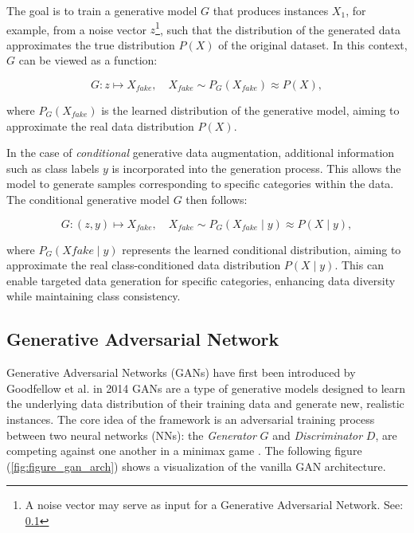 The goal is to train a generative model \( G \) that produces instances \( X_1 \), for example, from a noise vector \( z \)\footnote{A noise vector may serve as input for a Generative Adversarial Network. See: \ref{theoretical_gan}}, such that the distribution of the generated data approximates the true distribution \( P(X) \) of the original dataset. In this context, \( G \) can be viewed as a function:

\[
G: z \mapsto X_{fake}, \quad X_{fake} \sim P_G(X_{fake}) \approx P(X),
\]

\noindent
where \( P_G(X_{fake}) \) is the learned distribution of the generative model, aiming to approximate the real data distribution \( P(X) \).

In the case of \textit{conditional} generative data augmentation, additional information such as class labels \( y \) is incorporated into the generation process. This allows the model to generate samples corresponding to specific categories within the data. The conditional generative model \( G \) then follows:

\[
G: (z, y) \mapsto X_{fake}, \quad X_{fake} \sim P_G(X_{fake} \mid y) \approx P(X \mid y),
\]

\noindent
where \( P_G(X{fake} \mid y) \) represents the learned conditional distribution, aiming to approximate the real class-conditioned data distribution \( P(X \mid y) \). This can enable targeted data generation for specific categories, enhancing data diversity while maintaining class consistency.





\subsection[Generative Adversarial Network - GAN]{Generative Adversarial Network}\label{theoretical_gan}
Generative Adversarial Networks (GANs) have first been introduced by Goodfellow et al. in 2014 \cite{goodfellow2014generativeadversarialnetworks} GANs are a type of generative models designed to learn the underlying data distribution of their training data and generate new, realistic instances. The core idea of the framework is an adversarial training process between two neural networks (NNs): the \textit{Generator} \(G\) and \textit{Discriminator} \(D\), are competing against one another in a minimax game \cite{VonNeumann1928Minimax}. The following figure (\ref{fig:figure_gan_arch}) shows a visualization of the vanilla GAN architecture.

